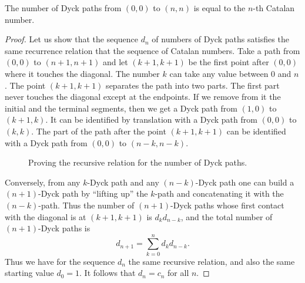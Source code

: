 \begin{page}
\setcounter{section}{4}
\setcounter{subsection}{5}
\setcounter{dfn}{8}
\label{portion:883}

\begin{thm}
The number of Dyck paths from $(0,0)$ to $(n,n)$ is equal to the $n$-th Catalan number.
\end{thm}

\end{page}

\begin{page}
\setcounter{section}{4}
\setcounter{subsection}{5}
\setcounter{dfn}{8}
\label{portion:884}

\begin{proof}
Let us show that the sequence $d_n$ of numbers of Dyck paths satisfies the same recurrence relation that the sequence of Catalan numbers.
Take a path from $(0,0)$ to $(n+1,n+1)$ and let $(k+1,k+1)$ be the first point after $(0,0)$ where it touches the diagonal.
The number $k$ can take any value between $0$ and $n$.
The point $(k+1,k+1)$ separates the path into two parts.
The first part never touches the diagonal except at the endpoints.
If we remove from it the initial and the terminal segments, then we get a Dyck path from $(1,0)$ to $(k+1,k)$.
It can be identified by translation with a Dyck path from $(0,0)$ to $(k,k)$.
The part of the path after the point $(k+1,k+1)$ can be identified with a Dyck path from $(0,0)$ to $(n-k,n-k)$.

\begin{figure}[ht]
\begin{center}

\end{center}
\caption{Proving the recursive relation for the number of Dyck paths.}
\label{fig:DyckInduction}
\end{figure}

Conversely, from any $k$-Dyck path and any $(n-k)$-Dyck path one can build a $(n+1)$-Dyck path
by ``lifting up'' the $k$-path and concatenating it with the $(n-k)$-path.
Thus the number of $(n+1)$-Dyck paths whose first contact with the diagonal is at $(k+1, k+1)$ is $d_k d_{n-k}$,
and the total number of $(n+1)$-Dyck paths is
\[
d_{n+1} = \sum_{k=0}^n d_k d_{n-k}.
\]
Thus we have for the sequence $d_n$ the same recursive relation, and also the same starting value $d_0 = 1$.
It follows that $d_n = c_n$ for all $n$.
\end{proof}


\end{page}
